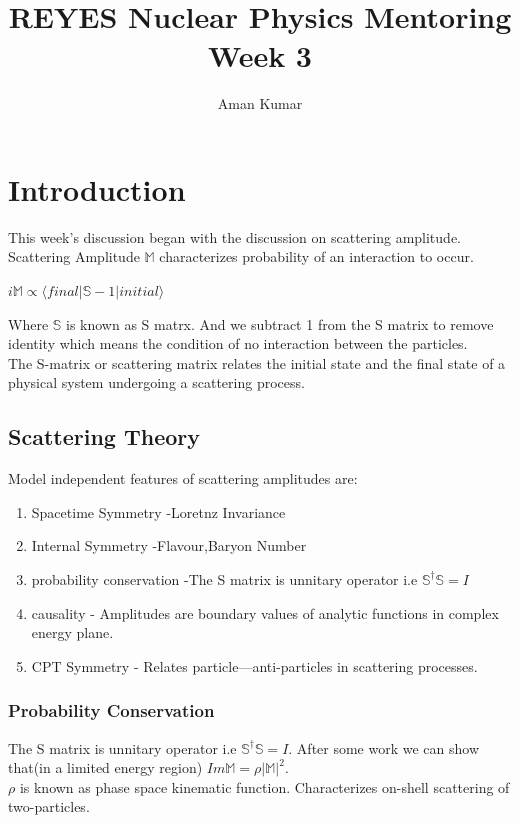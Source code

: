 \documentclass[a4paper]{article}
\title{REYES Nuclear Physics Mentoring Week 3}
\author{Aman Kumar}
\begin{document}
\maketitle
\section{Introduction}
This week's discussion began with the discussion on scattering amplitude. Scattering Amplitude $\mathbb{M}$ characterizes probability
of an interaction to occur.

$i\mathbb{M}\propto \langle final | \mathbb{S} -1 | initial \rangle$

Where $\mathbb{S}$ is known as S matrx. And we subtract 1 from the S matrix to remove identity which means the condition of no interaction
between the particles. \\

The S-matrix or scattering matrix relates the initial state and the final state of a physical system undergoing a scattering process.

\subsection{Scattering Theory}
Model independent features of scattering amplitudes are: 
\begin{enumerate}
    \item Spacetime Symmetry -Loretnz Invariance
    \item Internal Symmetry -Flavour,Baryon Number
    \item probability conservation -The S matrix is unnitary operator i.e $\mathbb{S}^{\dagger}\mathbb{S}=I$
    \item causality - Amplitudes are boundary values of analytic functions in complex energy plane.
    \item CPT Symmetry - Relates particle—anti-particles in scattering processes.
\end{enumerate}

\subsubsection{Probability Conservation}
The S matrix is unnitary operator i.e $\mathbb{S}^{\dagger}\mathbb{S}=I$.
After some work we can show that(in a limited energy region) $Im \mathbb{M} = \rho |\mathbb{M}|^2$.
\\
$\rho$ is known as phase space kinematic function. Characterizes on-shell scattering of two-particles.
\end{document}
